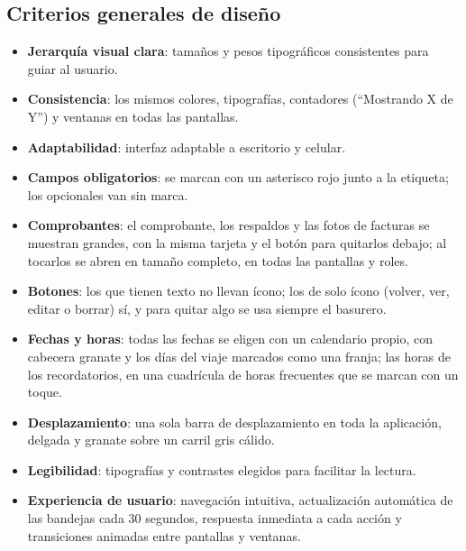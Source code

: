 \documentclass[11pt,letterpaper]{article}
\begin{document}
\subsection{Criterios generales de diseño}
\begin{itemize}
  \item \textbf{Jerarquía visual clara}: tamaños y pesos tipográficos consistentes para guiar al usuario.
  \item \textbf{Consistencia}: los mismos colores, tipografías, contadores (``Mostrando X de Y'') y ventanas en todas las pantallas.
  \item \textbf{Adaptabilidad}: interfaz adaptable a escritorio y celular.
  \item \textbf{Campos obligatorios}: se marcan con un asterisco rojo junto a la etiqueta; los opcionales van sin marca.
  \item \textbf{Comprobantes}: el comprobante, los respaldos y las fotos de facturas se muestran grandes, con la misma tarjeta y el botón para quitarlos debajo; al tocarlos se abren en tamaño completo, en todas las pantallas y roles.
  \item \textbf{Botones}: los que tienen texto no llevan ícono; los de solo ícono (volver, ver, editar o borrar) sí, y para quitar algo se usa siempre el basurero.
  \item \textbf{Fechas y horas}: todas las fechas se eligen con un calendario propio, con cabecera granate y los días del viaje marcados como una franja; las horas de los recordatorios, en una cuadrícula de horas frecuentes que se marcan con un toque.
  \item \textbf{Desplazamiento}: una sola barra de desplazamiento en toda la aplicación, delgada y granate sobre un carril gris cálido.
  \item \textbf{Legibilidad}: tipografías y contrastes elegidos para facilitar la lectura.
  \item \textbf{Experiencia de usuario}: navegación intuitiva, actualización automática de las bandejas cada 30 segundos, respuesta inmediata a cada acción y transiciones animadas entre pantallas y ventanas.
\end{itemize}
\end{document}
